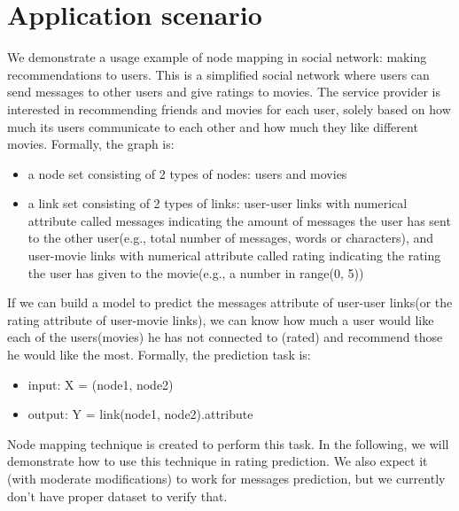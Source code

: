 \documentclass{article}
\begin{document}
\section{Application scenario}
We demonstrate a usage example of node mapping in social network: making 
recommendations to users.
This is a simplified social network where users can send messages to other 
users and give ratings to movies.
The service provider is interested in recommending friends and movies for each 
user, solely based on how much its users communicate to each other and how much 
they like different movies.
Formally, the graph is:
\begin{itemize}
	\item a node set consisting of 2 types of nodes: users and movies
	\item a link set consisting of 2 types of links: user-user links with 
	numerical attribute called messages indicating the amount of messages the 
	user has sent to the other 	user(e.g., total number of messages, words 
	or characters),
	and user-movie links with numerical attribute called rating indicating the 
	rating the user has given to the movie(e.g., a number in range(0, 5))
\end{itemize}
If we can build a model to predict the messages attribute of user-user links(or 
the rating attribute of user-movie links), we can know how much a user would 
like each of the users(movies) he has not connected to (rated) and recommend 
those he would like the most.
Formally, the prediction task is:
\begin{itemize}
	\item input: X = (node1, node2)
	\item output: Y = link(node1, node2).attribute
\end{itemize}
Node mapping technique is created to perform this task. In the following, we 
will demonstrate how to use this technique in rating prediction. We also expect 
it (with moderate modifications) to work for messages prediction, but we 
currently don't have proper dataset to verify that.
\end{document}
